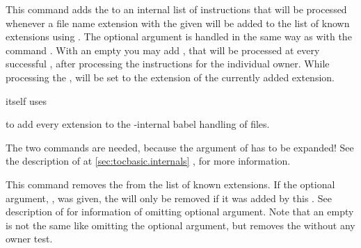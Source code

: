 \begin{Declaration}
\end{Declaration}
%
This command adds the  to an internal list of instructions
that will be processed whenever a file name extension with the given
 will be added to the list of known extensions using
.  The optional argument is handled in the same way as
with the command . With an empty  you may
add , that will be processed at every successful
, after processing the instructions for the individual
owner.  While processing the ,
 will be set to
the extension of the currently added extension.
\begin{Example}
   itself uses
\begin{lstcode}
  \AtAddToTocList[]{%
    \expandafter\tocbasic@extend@babel
    \expandafter{\@currext}%
  }
\end{lstcode}
  to add every extension to the -internal babel handling of
  files.
\end{Example}

The two  commands are needed, because the argument of
 has to be expanded!  See the description of
 at \autoref{sec:tocbasic.internals}%
,  for more information.%
%

\begin{Declaration}
\end{Declaration}
%
This command removes the  from the list of known extensions.
If the optional argument, , was given, the 
will only be removed if it was added by this . See description of
 for information of omitting optional argument. Note that
an empty  is not the same like omitting the optional argument,
but removes the  without any owner test.%
%

